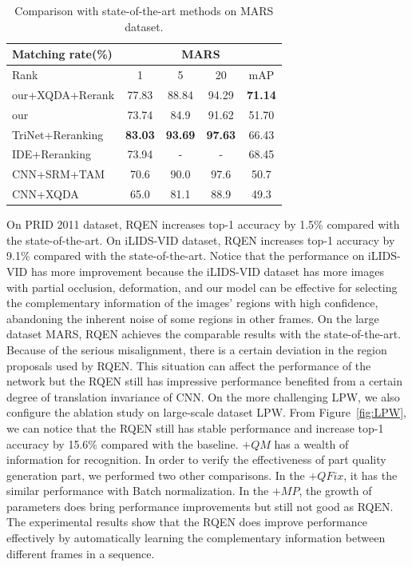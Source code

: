 \documentclass[letterpaper]{article} %
\begin{document}
\begin{table}[t]
\centering
\caption{Comparison with state-of-the-art methods on MARS dataset.}
\begin{tabular}{l|c|c|c|c}
\hline
  Matching rate(\%)& \multicolumn{4}{c}{MARS} \\
  \hline
  Rank & 1 & 5& 20 & mAP\\
\hline
our+XQDA+Rerank & 77.83 & 88.84& 94.29 &{\bf71.14}\\
our &73.74 &84.9&91.62&51.70\\
\hline
TriNet+Reranking&{\bf83.03}&{\bf93.69}&{\bf97.63}&66.43\\
IDE+Reranking &73.94&-&-&68.45\\
CNN+SRM+TAM &70.6 &90.0&97.6&50.7\\
CNN+XQDA & 65.0 & 81.1 & 88.9 &49.3 \\
\hline
\end{tabular}
\label{table:mars_performance}
\end{table}


 On PRID 2011 dataset, RQEN increases top-1 accuracy by 1.5\% compared with the state-of-the-art. On iLIDS-VID dataset, RQEN increases top-1 accuracy by 9.1\% compared with the state-of-the-art. Notice that the performance on iLIDS-VID has more improvement because the iLIDS-VID dataset has more images with partial occlusion, deformation, and our model can be effective for selecting the complementary information of the images' regions with high confidence, abandoning the inherent noise of some regions in other frames.
On the large dataset MARS, RQEN achieves the comparable results with the state-of-the-art. Because of the serious misalignment, there is a certain deviation in the region proposals used by RQEN. This situation can affect the performance of the network but the RQEN still has impressive performance benefited from a certain degree of translation invariance of CNN.
On the more challenging LPW, we also configure the ablation study on large-scale dataset LPW. From Figure~\ref{fig:LPW}, we can notice that the RQEN still has stable performance and increase top-1 accuracy by 15.6\% compared with the baseline. $+QM$ has a wealth of information for recognition. In order to verify the effectiveness of part quality generation part, we performed two other comparisons. In the $+QFix$, it has the similar performance with Batch normalization. In the $+MP$, the growth of parameters does bring performance improvements but still not good as RQEN. The experimental results show that the RQEN does improve performance effectively by automatically learning the complementary information between different frames in a sequence.
\end{document}

